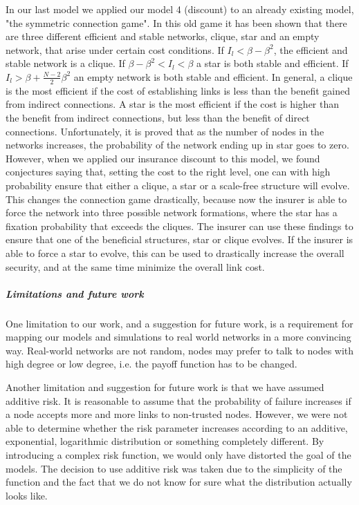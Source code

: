 In our last model we applied our model 4 (discount) to an already existing model, "the symmetric connection game". In this old game it has been shown that there are three different efficient and stable networks, clique, star and an empty network, that arise under certain cost conditions. If $I_{l}<\beta-\beta^{2}$, the efficient and stable network is a clique. If $\beta-\beta^{2}<I_{l}<\beta$ a star is both stable and efficient. If $I_{l}>\beta+\frac{N-2}{2}\beta^{2}$ an empty network is both stable and efficient. In general, a clique is the most efficient if the cost of establishing links is less than the benefit gained from indirect connections. A star is the most efficient if the cost is higher than the benefit from indirect connections, but less than the benefit of direct connections. 
Unfortunately, it is proved that as the number of nodes in the networks increases, the probability of the network ending up in star goes to zero. However, when we applied our insurance discount to this model, we found conjectures saying that, setting the cost to the right level, one can with high probability ensure that either a clique, a star or a scale-free structure will evolve. This changes the connection game drastically, because now the insurer is able to force the network into three possible network formations, where the star has a fixation probability that exceeds the cliques. The insurer can use these findings to ensure that one of the beneficial structures, star or clique evolves. If the insurer is able to force a star to evolve, this can be used to drastically increase the overall security, and at the same time minimize the overall link cost. 

\subparagraph{Limitations and future work}
One limitation to our work, and a suggestion for future work, is a requirement for mapping our models and simulations to real world networks in a more convincing way. Real-world networks are not random, nodes may prefer to talk to nodes with high degree or low degree, i.e. the payoff function has to be changed. 

Another limitation and suggestion for future work is that we have assumed additive risk. It is reasonable to assume that the probability of failure increases if a node accepts more and more links to non-trusted nodes. However, we were not able to determine whether the risk parameter increases according to an additive, exponential, logarithmic distribution or something completely different. By introducing a complex risk function, we would only have distorted the goal of the models. The decision to use additive risk was taken due to the simplicity of the function and the fact that we do not know for sure what the distribution actually looks like.

